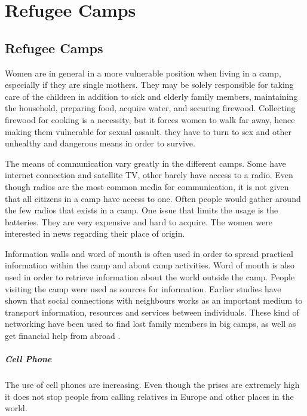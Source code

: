 \chapter{Refugee Camps}
\label{chp:refugeecamps} 

\section{Refugee Camps}

Women are in general in a more vulnerable position when living in a  camp, especially if they are single mothers. They may be solely responsible for taking care of the children in addition to sick and elderly family members, maintaining the household, preparing food, acquire water, and securing firewood. Collecting firewood for cooking is a necessity, but it forces women  to walk far away, hence making them vulnerable for sexual assault. they have to turn to sex and other unhealthy and dangerous means in order to survive. \cite{womenRefugee} 


The means of communication vary greatly in the different camps. Some have internet connection and satellite TV, other barely have access to a radio. Even though radios are the most common media for communication, it is not given that all citizens in a camp have access to one. Often people would gather around the few radios that exists in a camp. One issue that limits the usage is the batteries. They are very expensive and hard to acquire. The women were interested in news regarding their place of origin. 

Information walls and word of mouth is often used in order to spread practical information within the camp and about camp activities. Word of mouth is also used in order to retrieve information about the world outside the camp. People visiting the camp were used as sources for information. Earlier studies have shown that social connections with neighbours works as an important medium to transport information, resources and services between individuals. These kind of networking have been used to find lost family members in big camps, as well as get financial help from abroad \cite{womenRefugee}.  



\paragraph{Cell Phone}
The use of cell phones are increasing. Even though the prises are extremely high it does not stop people from calling relatives in Europe and other places in the world. 
\cite{womenRefugee} 

